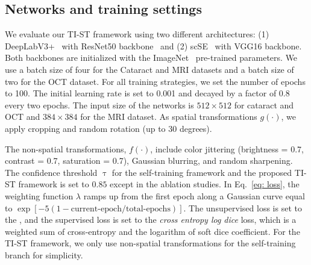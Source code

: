\subsection{Networks and training settings}
We evaluate our TI-ST framework using two different architectures:  (1) DeepLabV3+~ with ResNet50 backbone~ and (2) scSE~ with VGG16 backbone. Both backbones are initialized with the ImageNet~ pre-trained parameters. We use a batch size of four for the Cataract and MRI datasets and a batch size of two for the OCT dataset. For all training strategies, we set the number of epochs to 100. The initial learning rate is set to 0.001 and decayed by a factor of $0.8$ every two epochs. The input size of the networks is $512\times 512$ for cataract and OCT and $384\times 384$ for the MRI dataset. 
As spatial transformations $g(\cdot)$, we apply cropping and random rotation (up to 30 degrees). 

The non-spatial transformations, $f(\cdot)$, include color jittering (brightness = 0.7, contrast = 0.7, saturation = 0.7), Gaussian blurring, and random sharpening. The confidence threshold $\uptau$ for the self-training framework and the proposed TI-ST framework is set to $0.85$ except in the ablation studies. In Eq.~\eqref{eq: loss}, the weighting function $\lambda$ ramps up from the first epoch along a Gaussian curve equal to $\exp[-5(1-\text{current-epoch}/{\text{total-epochs}})]$. The unsupervised loss is set to the , and the supervised loss is set to the \textit{cross entropy log dice} loss, which is a weighted sum of cross-entropy and the logarithm of soft dice coefficient. For the TI-ST framework, we only use non-spatial transformations for the self-training branch for simplicity.

